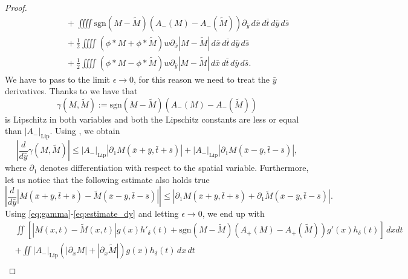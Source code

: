 \documentclass[11pt,a4paper,oneside]{amsart}
\newcommand{\sgn}{\text{sgn}}
\newcommand{\Lip}{\text{Lip}}
\newcommand\eps{\epsilon}
\begin{document}
\begin{proof}
\begin{equation}
\begin{aligned}
            &\hspace{4em}+  \iiiint \sgn(M-\tilde M)(A_-(M)-A_-(\tilde M))\partial_{\bar y}\,d\bar x\,d\bar t\,d\bar y\,d\bar s\\
            &\hspace{4em}+  \frac{1}{2}\iiiint (\phi\ast M + \phi\ast \tilde M)w\partial_{\bar x}|M-\tilde M|\,d\bar x\,d\bar t\,d\bar y\,d\bar s\\
            &\hspace{4em}+  \frac{1}{2}\iiiint (\phi\ast M - \phi\ast \tilde M)w\partial_{\bar y}|M-\tilde M|\,d\bar x\,d\bar t\,d\bar y\,d\bar s.
        \end{aligned}
         \end{equation}
        We have to pass to the limit $\eps\to0$, for this reason we need to treat the $\bar y$ derivatives. Thanks to \cite[Lemma 5.4]{Leslie-Tan} we have that
        $$
        \gamma(M,\tilde M):=\sgn(M-\tilde M)(A_-(M)-A_-(\tilde M))
        $$
        is Lipschitz in both variables and both the Lipschitz constants are less or equal than $|A_-|_{\Lip}$.\newline
        Using \cite[Lemma 5.2 \& Lemma 5.4]{Leslie-Tan}, we obtain
        \begin{equation}\label{eq:gamma}
            \left|\frac{d}{d\bar y}\gamma(M,\tilde M)\right|\leq|A_-|_{\Lip}\left|\partial_1 M(\bar x+\bar y,\bar t+\bar s)\right|
            +|A_-|_{\Lip}\left|\partial_1 M(\bar x-\bar y,\bar t-\bar s)\right|,
        \end{equation}
        where $\partial_1$ denotes differentiation with respect to the spatial variable.
        Furthermore, let us notice that the following estimate also holds true
        \begin{equation}\label{eq:estimate_dy}
             \left| \frac{d}{d\bar y}\left|M(\bar x+\bar y,\bar t+\bar s)-\tilde M(\bar x-\bar y,\bar t-\bar s)\right|\right| 
             \leq \left| \partial_1 M(\bar x+\bar y,\bar t+\bar s)+\partial_1\tilde M(\bar x-\bar y,\bar t-\bar s)\right|.
        \end{equation}
        Using \eqref{eq:gamma}-\eqref{eq:estimate_dy} and letting $\eps\to0$, we end up with
        \begin{align*}
             & \iint \left[ |M( x,t )-\tilde M( x,t)|g(x)h'_\delta(t)+\sgn(M-\tilde M)(A_+(M)-A_+(\tilde M))g'(x)h_\delta(t) \right]\,dxdt\\
            & + \iint |A_-|_{\Lip}(|\partial_x M|+|\partial_x\tilde M|)g(x)h_\delta(t)\,dx\,dt\\

\end{align*}
\end{proof}
\end{document}
